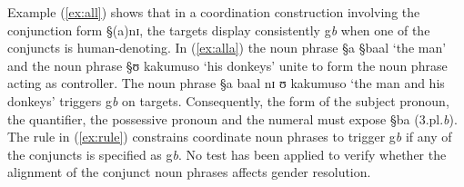 Example (\ref{ex:all}) shows that in a coordination construction
involving the conjunction form {\S (a)nɪ},  the targets display
consistently {\sc g}{\it b} when one of the conjuncts is
human-denoting.  In (\ref{ex:alla}) the noun
phrase {\S a} {\S baal} `the man' and the noun phrase
 {\S ʊ  kakumuso} `his donkeys' unite to form the noun
phrase acting as controller.  The noun phrase  {\S a
 baal nɪ ʊ kakumuso} `the man and his
donkeys' triggers {\sc g}{\it b} on targets.  Consequently, the
form of the subject pronoun, the quantifier, the possessive pronoun
and the numeral must expose  {\S ba} ({\sc 3.pl.}{\it b}).
The rule in (\ref{ex:rule}) constrains coordinate noun phrases to
trigger {\sc g}{\it b} if any of the conjuncts is specified as
{\sc g}{\it b}. No test has been applied to verify whether the
alignment of the conjunct noun phrases affects gender
resolution.






